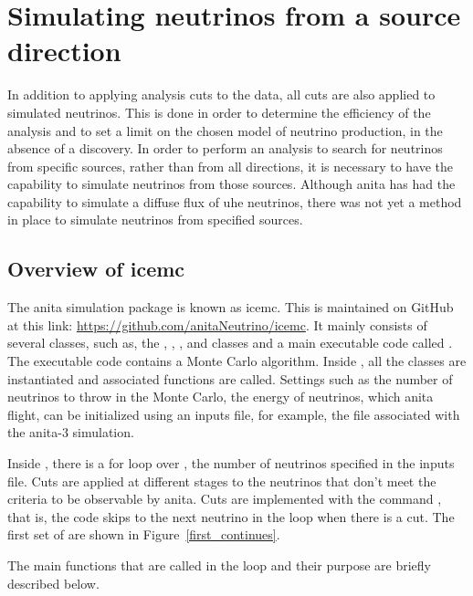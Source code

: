 \section{Simulating neutrinos from a source direction}
\label{grb_sim}

In addition to applying analysis cuts to the data, all cuts are also applied to simulated neutrinos. This is done in order to determine the efficiency of the analysis and to set a limit on the chosen model of neutrino production, in the absence of a discovery. In order to perform an analysis to search for neutrinos from specific sources, rather than from all directions, it is necessary to have the capability to simulate neutrinos from those sources. Although \gls{anita} has had the capability to simulate a diffuse flux of \gls{uhe} neutrinos, there was not yet a method in place to simulate neutrinos from specified sources. 

\subsection{Overview of icemc}

The \gls{anita} simulation package is known as icemc. This is maintained on GitHub at this link: \href{https://github.com/anitaNeutrino/icemc}{https://github.com/anitaNeutrino/icemc}. It mainly consists of several classes, such as, the , , , and  classes and a main executable code called . The executable code  contains a Monte Carlo algorithm. Inside , all the classes are instantiated and associated functions are called. Settings such as the number of neutrinos to throw in the Monte Carlo, the energy of neutrinos, which \gls{anita} flight, can be initialized using an inputs file, for example, the  file associated with the \gls{anita}-3 simulation.  

Inside , there is a for loop over , the number of neutrinos specified in the inputs file. Cuts are applied at different stages to the neutrinos that don't meet the criteria to be observable by \gls{anita}. Cuts are implemented with the command , that is, the code skips to the next neutrino in the loop when there is a cut. The first set of  are shown in Figure~\ref{first_continues}.

The main functions that are called in the loop and their purpose are briefly described below. 


